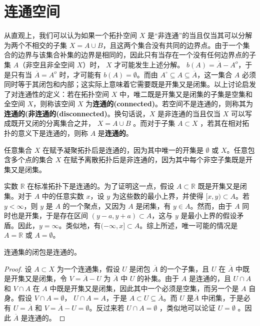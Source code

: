 \section{连通空间}

从直观上，我们可以认为如果一个拓扑空间 $X$ 是“非连通”的当且仅当其可以分解为两个不相交的子集 $X=A\cup B$，且这两个集合没有共同的边界点。由于一个集合的边界与该集合补集的边界是相同的，因此只有当存在一个没有任何边界点的子集 $A$（非空且非全空间 $X$）时， $X$ 才可能发生上述分解。 $b(A)=\overline{A} -A^{o}$，于是只有当 $\overline{A} =A^{o}$ 时，才可能有 $b(A)=\emptyset $。而由 $A^{\circ } \subseteq A\subseteq \overline{A}$，这一集合 $A$ 必须同时等于其闭包和内部；这实际上意味着它需要既是开集又是闭集。以上讨论启发了对连通性的定义：若在拓扑空间 $X$ 中，唯二既是开集又是闭集的子集是空集和全空间 $X$，则称该空间 $X$ 为\textbf{连通的(connected)}。若空间不是连通的，则称其为\textbf{连通的(非连通的(disconnected)}。换句话说，$X$ 是非连通的当且仅当 $X$ 可以写成既开又闭的分离集合之并， $X=A\cup B$ 。而对于子集 $A\subset X$ ，若其在相对拓扑的意义下是连通的，则称 $A$ 是\textbf{连通的}。

\begin{eg} \label{eg:10.17} 
	任意集合 $X$ 在赋予凝聚拓扑后是连通的，因为其中唯一的开集是 $\emptyset $ 或 $X$。任意包含多个点的集合 $X$ 在赋予离散拓扑后是非连通的，因为其中每个非空子集既是开集又是闭集。
\end{eg}

\begin{eg}\label{eg:10.18} 
	实数 $\mathbb{R}$ 在标准拓扑下是连通的。为了证明这一点，假设 $A\subset \mathbb{R}$ 既是开集又是闭集。对于 $A$ 中的任意实数 $x$，设 $y$ 为这些数的最小上界，并使得 $[ x,y)\subset A$。若 $y< \infty $，则 $y$ 是 $A$ 的一个聚点，又因为 $A$ 是闭集，有 $y\in A$。然而，由于 $A$ 同时也是开集，于是存在区间 $(y-a,y+a)\subset A$，这与 $y$ 是最小上界的假设矛盾。因此，$y=\infty $。类似地，有$(-\infty ,x]\subset A$。综上所述，唯一可能的情况是 $A=\mathbb{R}$ 或 $A=\emptyset $。
\end{eg}

\begin{theorem}\label{thm:10.15} 
	连通集的闭包是连通的。
\end{theorem}

\begin{proof}
	设 $A\subset X$ 为一个连通集，假设 $U$ 是闭包 $\overline{A}$ 的一个子集，且 $U$ 在 $\overline{A}$ 中既是开集又是闭集，令 $V=\overline{A} -U$ 为 $\overline{A}$ 中 $U$ 的补集。由于 $A$ 是连通的，且 $U\cap A$ 和 $V\cap A$ 在 $A$ 中既是开集又是闭集，因此其中一个必须是空集，而另一个是 $A$ 自身。假设 $V\cap A=\emptyset $， $U\cap A=A$，于是 $A\subset U\subseteq \overline{A}$。而 $U$ 是$\overline{A}$ 中闭集，于是必有 $U=\overline{A}$ 和 $V=\overline{A} -U=\emptyset $。反过来若 $U\cap A=\emptyset $ ，类似地可以论证 $U=\emptyset $ 。因此 $\overline{A}$ 是连通的。
\end{proof}

